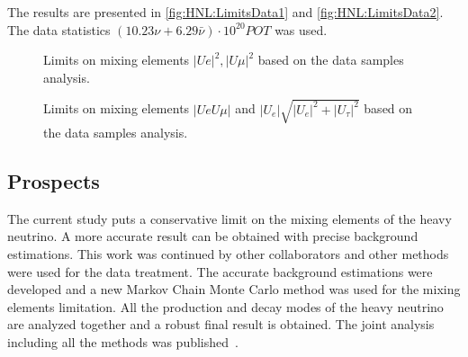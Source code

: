 \documentclass[../main.tex]{subfiles}
\begin{document}
The results are presented in \autoref{fig:HNL:LimitsData1} and \autoref{fig:HNL:LimitsData2}. The data statistics $\left(10.23\nu+6.29\bar{\nu}\right)\cdot 10^{20}POT$ was used.

\begin{figure}[!ht]
    \begin{center}
  \begin{minipage}{0.49\linewidth}
  \end{minipage}
  \hfill
  \begin{minipage}{0.49\linewidth}
  \end{minipage}
  \caption{Limits on mixing elements $\left|Ue\right|^2, \left|U\mu\right|^2$ based on the data samples analysis.}
  \label{fig:HNL:LimitsData1}
    \end{center}
\end{figure}

\begin{figure}[!ht]
    \begin{center}
  \begin{minipage}{0.49\linewidth}
  \end{minipage}
  \begin{minipage}{0.49\linewidth}
  \end{minipage}
  \caption{Limits on mixing elements $\left|UeU\mu\right|$ and $\left|U_{e}\right|\sqrt{\left|U_{e}\right|^2+\left|U_{\tau}\right|^2}$ based on the data samples analysis.}
  \label{fig:HNL:LimitsData2}
  \end{center}
\end{figure}

\subsection{Prospects}
\label{sec:HNL:prosp}
The current study puts a conservative limit on the mixing elements of the heavy neutrino. A more accurate result can be obtained with precise background estimations. This work was continued by other collaborators and other methods were used for the data treatment. The accurate background estimations were developed and a new Markov Chain Monte Carlo method was used for the mixing elements limitation. All the production and decay modes of the heavy neutrino are analyzed together and a robust final result is obtained. The joint analysis including all the methods was published~\cite{Abe2019l}.
\end{document}
